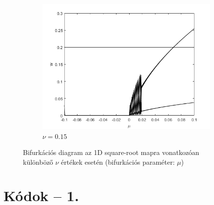 \begin{figure}[ht!]
     \begin{subfigure}[b]{0.45\linewidth}
         \centering
         \includegraphics[width=1\linewidth]{graphics/bif_015.png}
         \caption{$\nu=0.15$}
         \label{fig:nagy_csillapitas}
     \end{subfigure}
     \caption{Bifurkációs diagram az 1D square-root mapra vonatkozóan különböző $\nu$ értékek esetén (bifurkációs paraméter: $\mu$)}\label{fig:bif}
\end{figure}

\newpage
\section{Kódok -- 1.}\label{ap:codes1}

